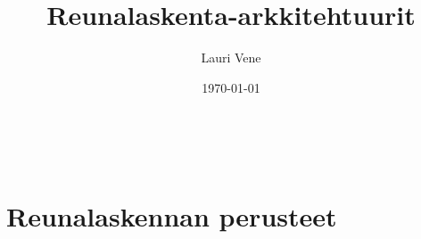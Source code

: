 \documentclass[finnish]{tktltiki2}
\title{Reunalaskenta-arkkitehtuurit}
\author{Lauri Vene}
\date{\today}
\theoremstyle{definition}
\theoremstyle{remark}
\begin{document}

\frontmatter      %

\maketitle        %
\makeabstract     %

\tableofcontents  %
\


\mainmatter       %

%
%
%




\section{Reunalaskennan perusteet} \label{perusteet}
\end{document}
